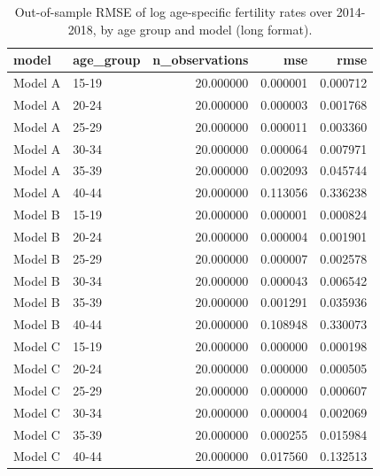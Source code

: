 \begin{table}[ht]
\centering
\begin{tabular}{llrrr}
\hline
model & age_group & n_observations & mse & rmse \\
\hline
Model A & 15-19 & 20.000000 & 0.000001 & 0.000712 \\
Model A & 20-24 & 20.000000 & 0.000003 & 0.001768 \\
Model A & 25-29 & 20.000000 & 0.000011 & 0.003360 \\
Model A & 30-34 & 20.000000 & 0.000064 & 0.007971 \\
Model A & 35-39 & 20.000000 & 0.002093 & 0.045744 \\
Model A & 40-44 & 20.000000 & 0.113056 & 0.336238 \\
Model B & 15-19 & 20.000000 & 0.000001 & 0.000824 \\
Model B & 20-24 & 20.000000 & 0.000004 & 0.001901 \\
Model B & 25-29 & 20.000000 & 0.000007 & 0.002578 \\
Model B & 30-34 & 20.000000 & 0.000043 & 0.006542 \\
Model B & 35-39 & 20.000000 & 0.001291 & 0.035936 \\
Model B & 40-44 & 20.000000 & 0.108948 & 0.330073 \\
Model C & 15-19 & 20.000000 & 0.000000 & 0.000198 \\
Model C & 20-24 & 20.000000 & 0.000000 & 0.000505 \\
Model C & 25-29 & 20.000000 & 0.000000 & 0.000607 \\
Model C & 30-34 & 20.000000 & 0.000004 & 0.002069 \\
Model C & 35-39 & 20.000000 & 0.000255 & 0.015984 \\
Model C & 40-44 & 20.000000 & 0.017560 & 0.132513 \\
\hline
\end{tabular}
\caption{Out-of-sample RMSE of log age-specific fertility rates over 2014-2018, by age group and model (long format).}
\label{tab:revised_table_e7_long}
\end{table}
